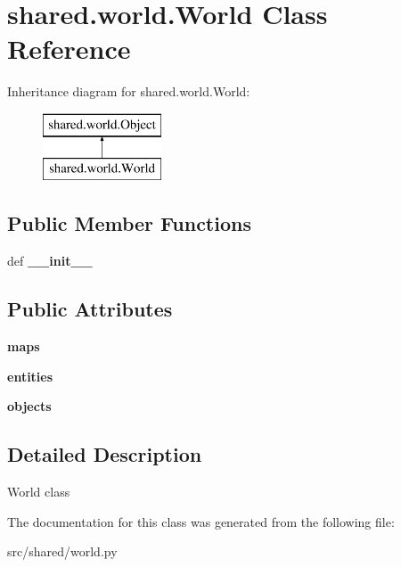 \hypertarget{classshared_1_1world_1_1_world}{\section{shared.\-world.\-World \-Class \-Reference}
\label{classshared_1_1world_1_1_world}
}
\-Inheritance diagram for shared.\-world.\-World\-:\begin{figure}[H]
\begin{center}
\leavevmode
\includegraphics[height=2.000000cm]{classshared_1_1world_1_1_world}
\end{center}
\end{figure}
\subsection*{\-Public \-Member \-Functions}
\begin{DoxyCompactItemize}
\item 
\hypertarget{classshared_1_1world_1_1_world_a71b3d6f78b42a9261ad0497b383d8237}{def {\bfseries \-\_\-\-\_\-init\-\_\-\-\_\-}}\label{classshared_1_1world_1_1_world_a71b3d6f78b42a9261ad0497b383d8237}

\end{DoxyCompactItemize}
\subsection*{\-Public \-Attributes}
\begin{DoxyCompactItemize}
\item 
\hypertarget{classshared_1_1world_1_1_world_abee654ac2b5a30d416bbbb5250aa0de8}{{\bfseries maps}}\label{classshared_1_1world_1_1_world_abee654ac2b5a30d416bbbb5250aa0de8}

\item 
\hypertarget{classshared_1_1world_1_1_world_a159a0a6dc213fa0b99978d0ce105ecb1}{{\bfseries entities}}\label{classshared_1_1world_1_1_world_a159a0a6dc213fa0b99978d0ce105ecb1}

\item 
\hypertarget{classshared_1_1world_1_1_world_a3a16d78974ebc136e5d0d76e8e47319e}{{\bfseries objects}}\label{classshared_1_1world_1_1_world_a3a16d78974ebc136e5d0d76e8e47319e}

\end{DoxyCompactItemize}


\subsection{\-Detailed \-Description}
\begin{DoxyVerb}World class \end{DoxyVerb}
 

\-The documentation for this class was generated from the following file\-:\begin{DoxyCompactItemize}
\item 
src/shared/world.\-py\end{DoxyCompactItemize}
